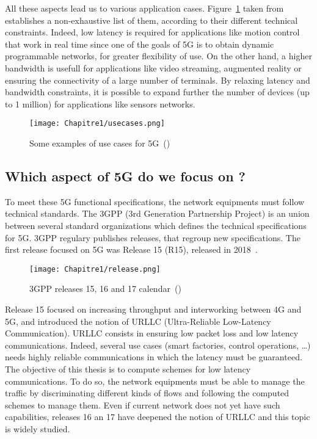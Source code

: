 All these aspects lead us to various application cases. Figure~\ref{fig:usecases} taken from~\cite{5GACIA} establishes a non-exhaustive list of them, according to their different technical constraints. Indeed, low latency is required for applications like motion control that work in real time since one of the goals of 5G is to obtain dynamic programmable networks, for greater flexibility of use.
On the other hand, a higher bandwidth is usefull for applications like video streaming, augmented reality or ensuring the connectivity of a large number of terminals. By relaxing latency and bandwidth constraints, it is possible to expand further the number of devices (up to 1 million) for applications like sensors networks.

  \begin{figure}[h] 
      \begin{center}
      \texttt{[image: Chapitre1/usecases.png]}
      \end{center}
      \caption{Some examples of use cases for 5G~(\cite{5GACIA})}\label{fig:usecases}
      \end{figure}



\subsection{Which aspect of 5G do we focus on ?}


To meet these 5G functional specifications, the network equipments must follow technical standards. The 3GPP (3rd Generation Partnership Project) is an union between several standard organizations which defines the technical specifications for 5G. 3GPP regulary publishes releases, that regroup new specifications. The first release focused on 5G was Release 15 (R15), released in 2018~\cite{RELEASENOKIA}.  

  \begin{figure}[h]
      \begin{center}
      \texttt{[image: Chapitre1/release.png]}
      \end{center}
      \caption{3GPP releases 15, 16 and 17 calendar~(\cite{RELEASENOKIA})}\label{fig:release}
      \end{figure}
  

Release 15 focused on increasing throughput and interworking between 4G and 5G, and introduced the notion of URLLC (Ultra-Reliable Low-Latency Communication). URLLC consists in ensuring low packet loss and low latency communications. Indeed, several use cases (smart factories, control operations, \dots) needs highly reliable communications in which the latency must be guaranteed. 
The objective of this thesis is to compute schemes for low latency communications. To do so, the network equipments must be able to manage the traffic by discriminating different kinds of flows and following the computed schemes to manage them. Even if current network does not yet have such capabilities, releases 16 an 17 have deepened the notion of URLLC and this topic is widely studied. 

